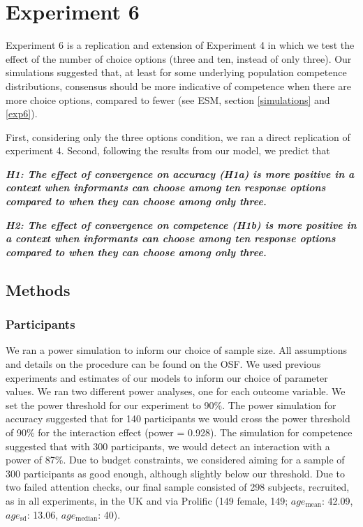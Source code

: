 \documentclass[
  doc,floatsintext]{apa6}
\begin{document}
\section{Experiment 6}\label{experiment-6}

Experiment 6 is a replication and extension of Experiment 4 in which we test the effect of the number of choice options (three and ten, instead of only three). Our simulations suggested that, at least for some underlying population competence distributions, consensus should be more indicative of competence when there are more choice options, compared to fewer (see ESM, section \ref{simulations} and \ref{exp6}).

First, considering only the three options condition, we ran a direct replication of experiment 4. Second, following the results from our model, we predict that

\textbf{\emph{H1: The effect of convergence on accuracy (H1a) is more positive in a context when informants can choose among ten response options compared to when they can choose among only three.}}

\textbf{\emph{H2: The effect of convergence on competence (H1b) is more positive in a context when informants can choose among ten response options compared to when they can choose among only three.}}

\subsection{Methods}\label{methods-5}

\subsubsection{Participants}\label{participants-5}

We ran a power simulation to inform our choice of sample size. All assumptions and details on the procedure can be found on the OSF. We used previous experiments and estimates of our models to inform our choice of parameter values. We ran two different power analyses, one for each outcome variable. We set the power threshold for our experiment to 90\%. The power simulation for accuracy suggested that for 140 participants we would cross the power threshold of 90\% for the interaction effect (power = 0.928). The simulation for competence suggested that with 300 participants, we would detect an interaction with a power of 87\%. Due to budget constraints, we considered aiming for a sample of 300 participants as good enough, although slightly below our threshold. Due to two failed attention checks, our final sample consisted of 298 subjects, recruited, as in all experiments, in the UK and via Prolific (149 female, 149; \(age_\text{mean}\): 42.09, \(age_\text{sd}\): 13.06, \(age_\text{median}\): 40).
\end{document}
